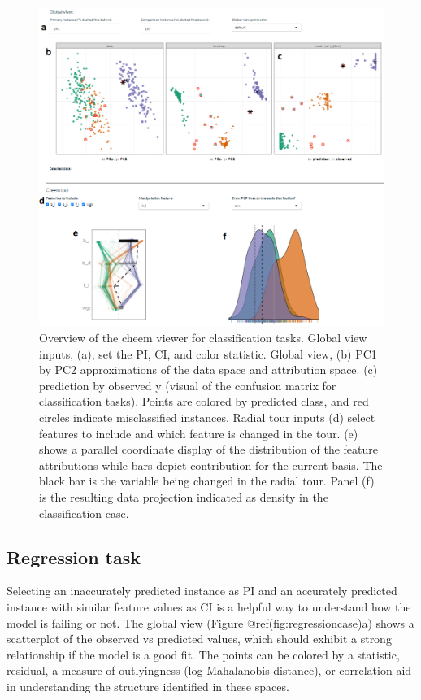 \documentclass[
]{article}
\begin{document}
\begin{figure}

{\centering \includegraphics[width=1\linewidth]{./figures/app_classification} 

}

\caption{Overview of the cheem viewer for classification tasks. Global view inputs, (a), set the PI, CI, and color statistic. Global view, (b) PC1 by PC2 approximations of the data space and attribution space. (c) prediction by observed y (visual of the confusion matrix for classification tasks). Points are colored by predicted class, and red circles indicate misclassified instances. Radial tour inputs (d) select features to include and which feature is changed in the tour. (e) shows a parallel coordinate display of the distribution of the feature attributions while bars depict contribution for the current basis. The black bar is the variable being changed in the radial tour. Panel (f) is the resulting data projection indicated as density in the classification case.}\label{fig:classificationcase}
\end{figure}

\hypertarget{regression-task}{%
\subsection{Regression task}\label{regression-task}}

Selecting an inaccurately predicted instance as PI and an accurately
predicted instance with similar feature values as CI is a helpful way to
understand how the model is failing or not. The global view (Figure
@ref(fig:regressioncase)a) shows a scatterplot of the observed vs
predicted values, which should exhibit a strong relationship if the
model is a good fit. The points can be colored by a statistic, residual,
a measure of outlyingness (log Mahalanobis distance), or correlation aid
in understanding the structure identified in these spaces.
\end{document}
